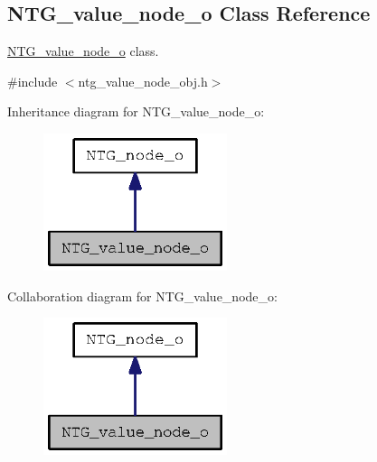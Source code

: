 \subsection{NTG\_\-value\_\-node\_\-o Class Reference}
\label{class_n_t_g__value__node__o}


\hyperlink{class_n_t_g__value__node__o}{NTG\_\-value\_\-node\_\-o} class.  




{\ttfamily \#include $<$ntg\_\-value\_\-node\_\-obj.h$>$}



Inheritance diagram for NTG\_\-value\_\-node\_\-o:
\nopagebreak
\begin{figure}[H]
\begin{center}
\leavevmode
\includegraphics[width=152pt]{class_n_t_g__value__node__o__inherit__graph}
\end{center}
\end{figure}


Collaboration diagram for NTG\_\-value\_\-node\_\-o:
\nopagebreak
\begin{figure}[H]
\begin{center}
\leavevmode
\includegraphics[width=152pt]{class_n_t_g__value__node__o__coll__graph}
\end{center}
\end{figure}
